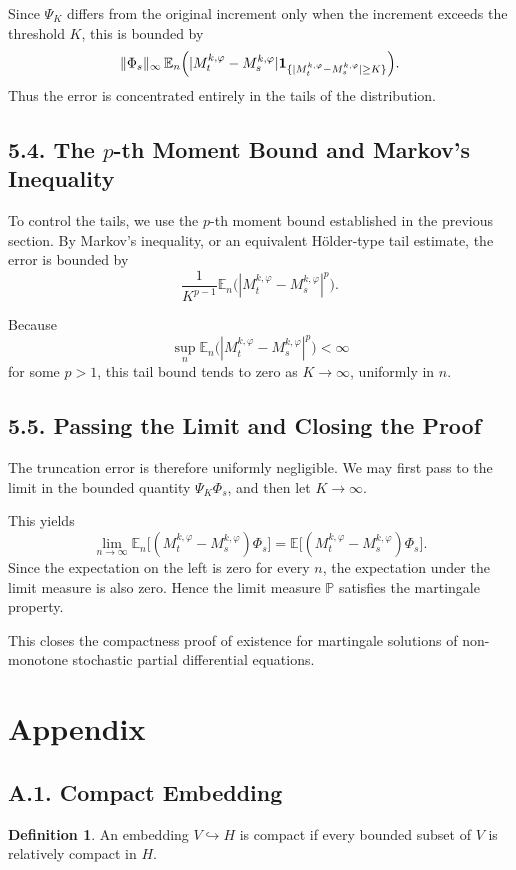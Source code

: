 \documentclass[11pt]{article}
\theoremstyle{definition}
\newtheorem{definition}{Definition}
\theoremstyle{remark}
\begin{document}
Since \(\Psi_K\) differs from the original increment only when the increment exceeds the threshold \(K\), this is bounded by
\[
\|\Phi_s\|_\infty
\,
\mathbb E_n\Bigl(
|M_t^{k,\varphi}-M_s^{k,\varphi}|
\mathbf 1_{\{|M_t^{k,\varphi}-M_s^{k,\varphi}|\ge K\}}
\Bigr).
\]
Thus the error is concentrated entirely in the tails of the distribution.

\subsection*{5.4. The \(p\)-th Moment Bound and Markov's Inequality}
To control the tails, we use the \(p\)-th moment bound established in the previous section. By Markov's inequality, or an equivalent Hölder-type tail estimate, the error is bounded by
\[
\frac{1}{K^{p-1}}
\mathbb E_n\bigl(|M_t^{k,\varphi}-M_s^{k,\varphi}|^p\bigr).
\]

Because
\[
\sup_n \mathbb E_n\bigl(|M_t^{k,\varphi}-M_s^{k,\varphi}|^p\bigr)<\infty
\]
for some \(p>1\), this tail bound tends to zero as \(K\to\infty\), uniformly in \(n\).

\subsection*{5.5. Passing the Limit and Closing the Proof}
The truncation error is therefore uniformly negligible. We may first pass to the limit in the bounded quantity \(\Psi_K\Phi_s\), and then let \(K\to\infty\).

This yields
\[
\lim_{n\to\infty}
\mathbb E_n\bigl[(M_t^{k,\varphi}-M_s^{k,\varphi})\Phi_s\bigr]
=
\mathbb E\bigl[(M_t^{k,\varphi}-M_s^{k,\varphi})\Phi_s\bigr].
\]
Since the expectation on the left is zero for every \(n\), the expectation under the limit measure is also zero. Hence the limit measure \(\mathbb P\) satisfies the martingale property.

This closes the compactness proof of existence for martingale solutions of non-monotone stochastic partial differential equations.

\section*{Appendix}

\subsection*{A.1. Compact Embedding}
\begin{definition}
An embedding \(V\hookrightarrow H\) is compact if every bounded subset of \(V\) is relatively compact in \(H\).
\end{definition}
\end{document}
